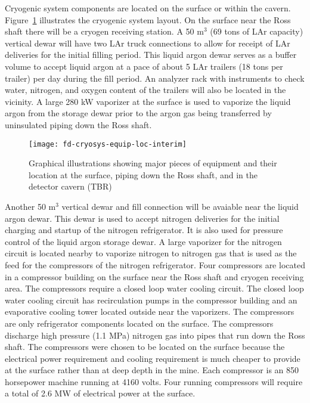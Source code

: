 Cryogenic system components are located on the surface or within the cavern. 
Figure~\ref{fig:eqp-at-surface}  illustrates the cryogenic system 
layout. On the surface near the Ross shaft there will be a cryogen 
receiving station. A 50 m$^3$ (69 tons of LAr capacity) 
vertical dewar will have two LAr truck connections 
to allow for receipt of LAr deliveries for the initial
filling period. This liquid argon dewar serves as a buffer volume 
to accept liquid argon at a pace of about 5 LAr trailers 
(18 tons per trailer) per day during the fill period. An analyzer
rack with instruments to check water, nitrogen, and oxygen content 
of the trailers will also be located in the vicinity. A large 
280 kW vaporizer at the surface is used to vaporize the liquid
argon from the storage dewar prior to the argon gas being 
transferred by uninsulated piping down the Ross shaft.

\begin{figure}[htbp]
\centering
\texttt{[image: fd-cryosys-equip-loc-interim]} 
\caption{Graphical illustrations showing major pieces of equipment and their location at the
surface, piping down the Ross shaft, and in the detector cavern (TBR)}
\label{fig:eqp-at-surface}
\end{figure}


Another 50 m$^3$ vertical dewar and fill connection will be 
avaiable near the liquid argon dewar. This dewar is used 
to accept nitrogen deliveries for the initial charging and startup of
the nitrogen refrigerator. It is also used for pressure control of 
the liquid argon storage dewar. A large vaporizer for the nitrogen 
circuit is located nearby to vaporize nitrogen to nitrogen gas
that is used as the feed for the compressors of the nitrogen 
refrigerator. Four compressors are located in a compressor 
building on the surface near the Ross shaft and cryogen
receiving area. The compressors require a closed loop water 
cooling circuit. The closed loop water cooling circuit has 
recirculation pumps in the compressor building and an evaporative
cooling tower located outside near the vaporizers. The 
compressors are only refrigerator components located on the surface. 
The compressors discharge high pressure (1.1 MPa) nitrogen gas into
pipes that run down the Ross shaft. The compressors were chosen 
to be located on the surface because the electrical power 
requirement and cooling requirement is much cheaper to provide
at the surface rather than at deep depth in the mine. Each 
compressor is an 850 horsepower machine running at 4160 volts. 
Four running compressors will require a total of
2.6 MW of electrical power at the surface.

